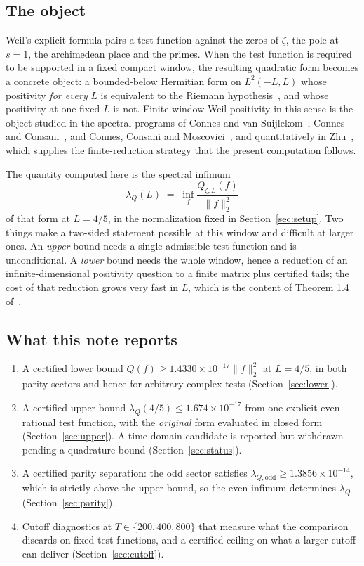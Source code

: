 \documentclass[11pt,a4paper]{article}
\theoremstyle{definition}
\theoremstyle{remark}
\newcommand{\lQ}{\lambda_{Q}}
\begin{document}
\subsection{The object}

Weil's explicit formula pairs a test function against the zeros of $\zeta$, the
pole at $s=1$, the archimedean place and the primes. When the test function is
required to be supported in a fixed compact window, the resulting quadratic form
becomes a concrete object: a bounded-below Hermitian form on $L^2(-L,L)$ whose
positivity \emph{for every} $L$ is equivalent to the Riemann
hypothesis~\cite{Weil,Bombieri}, and whose positivity at one fixed $L$ is not. Finite-window Weil
positivity in this sense is the object studied in the spectral programs of
Connes and van Suijlekom~\cite{CvS}, Connes and Consani~\cite{CC21}, and
Connes, Consani and Moscovici~\cite{CCM}, and quantitatively in Zhu~\cite{Zhu}, which supplies the
finite-reduction strategy that the present computation follows.

The quantity computed here is the spectral infimum
\[
   \lQ(L) \;=\; \inf_{f} \frac{Q_{\zeta,L}(f)}{\|f\|_2^2}
\]
of that form at $L = 4/5$, in the normalization fixed in
Section~\ref{sec:setup}. Two things make a two-sided statement possible at this
window and difficult at larger ones. An \emph{upper} bound needs a single
admissible test function and is unconditional. A \emph{lower} bound needs the
whole window, hence a reduction of an infinite-dimensional positivity question
to a finite matrix plus certified tails; the cost of that reduction grows very
fast in $L$, which is the content of Theorem 1.4 of~\cite{Zhu}.

\subsection{What this note reports}

\begin{enumerate}
\item A certified lower bound $Q(f) \ge 1.4330\times10^{-17}\|f\|_2^2$ at
  $L = 4/5$, in both parity sectors and hence for arbitrary complex tests
  (Section~\ref{sec:lower}).
\item A certified upper bound $\lQ(4/5) \le 1.674\times10^{-17}$ from one
  explicit even rational test function, with the \emph{original} form evaluated
  in closed form (Section~\ref{sec:upper}). A time-domain candidate is reported
  but withdrawn pending a quadrature bound (Section~\ref{sec:status}).
\item A certified parity separation: the odd sector satisfies
  $\lambda_{Q,\mathrm{odd}} \ge 1.3856\times10^{-14}$, which is strictly above the
  upper bound, so the even infimum determines $\lQ$
  (Section~\ref{sec:parity}).
\item Cutoff diagnostics at $T \in \{200,400,800\}$ that measure what the
  comparison discards on fixed test functions, and a certified ceiling on what
  a larger cutoff can deliver (Section~\ref{sec:cutoff}).
\end{enumerate}
\end{document}
